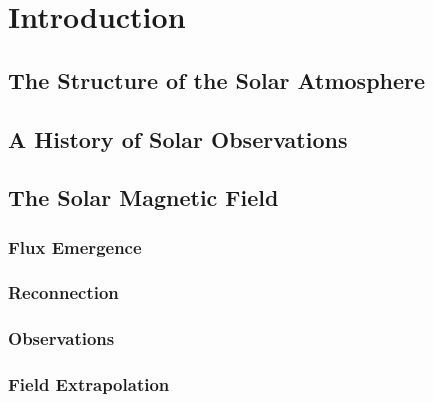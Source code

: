 \chapter{Introduction}\label{ch:introduction}


\section{The Structure of the Solar Atmosphere}

\section{A History of Solar Observations}

\section{The Solar Magnetic Field}

\subsection{Flux Emergence}


\subsection{Reconnection}

\subsection{Observations}


\subsection{Field Extrapolation}\label{sec:field_extrapolation}

